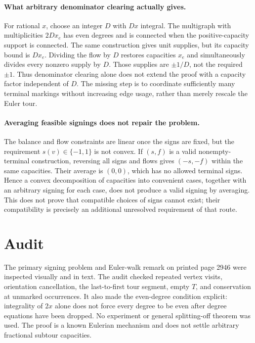 \documentclass[11pt]{article}
\begin{document}
\paragraph{What arbitrary denominator clearing actually gives.}
For rational $x$, choose an integer $D$ with $Dx$ integral.
The multigraph with multiplicities $2Dx_e$ has even degrees
and is connected when the positive-capacity support is connected.
The same construction gives unit supplies, but its capacity bound
is $Dx_e$. Dividing the flow by $D$ restores capacities $x_e$
and simultaneously divides every nonzero supply by $D$.
Those supplies are $\pm1/D$, not the required $\pm1$.
Thus denominator clearing alone does not extend the proof with a
capacity factor independent of $D$. The missing step is to
coordinate sufficiently many terminal markings without increasing
edge usage, rather than merely rescale the Euler tour.

\paragraph{Averaging feasible signings does not repair the problem.}
The balance and flow constraints are linear once the signs are
fixed, but the requirement $s(v)\in\{-1,1\}$ is not convex.
If $(s,f)$ is a valid nonempty-terminal construction, reversing
all signs and flows gives $(-s,-f)$ within the same capacities.
Their average is $(0,0)$, which has no allowed terminal signs.
Hence a convex decomposition of capacities into convenient cases,
together with an arbitrary signing for each case, does not produce
a valid signing by averaging. This does not prove that compatible
choices of signs cannot exist; their compatibility is precisely an
additional unresolved requirement of that route.

\section{Audit}
The primary signing problem and Euler-walk remark on printed page
2946 were inspected visually and in text. The audit checked
repeated vertex visits, orientation cancellation, the last-to-first
tour segment, empty $T$, and conservation at unmarked occurrences.
It also made the even-degree condition explicit: integrality of
$2x$ alone does not force every degree to be even after degree
equations have been dropped. No experiment or general splitting-off
theorem was used. The proof is a known Eulerian mechanism and
does not settle arbitrary fractional subtour capacities.
\end{document}
